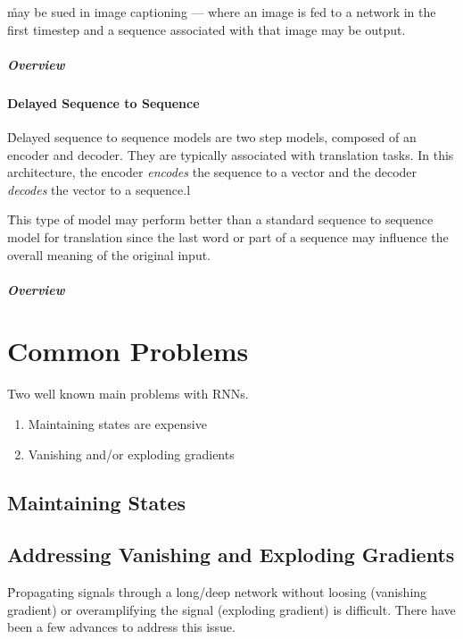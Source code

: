 \r{may be sued in image captioning --- where an image is fed to a network in the first timestep and a sequence associated with that image may be output.}

\subparagraph{Overview}


\paragraph{Delayed Sequence to Sequence}

\r{Delayed sequence to sequence models are two step models, composed of an encoder and decoder. They are typically associated with translation tasks.  In this architecture, the encoder \textit{encodes} the sequence to a vector and the decoder \textit{decodes} the vector to a sequence.}l

\r{This type of model may perform better than a standard sequence to sequence model for translation since the last word or part of a sequence may influence the overall meaning of the original input.}

\subparagraph{Overview}



\section{Common Problems}

Two well known main problems with RNNs.

\begin{enumerate}[noitemsep,topsep=0pt]
	\item Maintaining states are expensive
	\item Vanishing and/or exploding gradients
\end{enumerate}


\subsection{Maintaining States}


\subsection{Addressing Vanishing and Exploding Gradients}

\r{Propagating signals through a long/deep network without loosing (vanishing gradient) or overamplifying the signal (exploding gradient) is difficult.  There have been a few advances to address this issue.}

